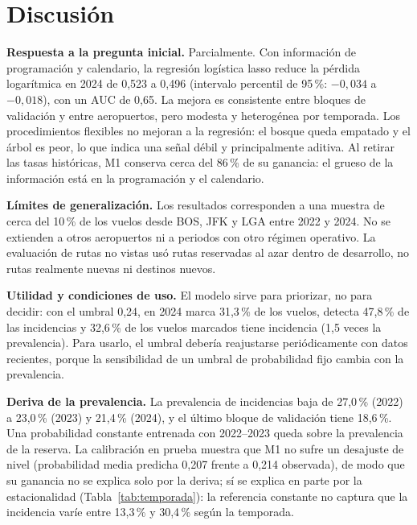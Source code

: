\documentclass[11pt,a4paper]{article}
\begin{document}
 
 
\section{Discusión}
\textbf{Respuesta a la pregunta inicial.} Parcialmente. Con información de programación y calendario, la regresión logística lasso reduce la pérdida logarítmica en 2024 de 0,523 a 0,496 (intervalo percentil de 95\,\%: $-0{,}034$ a $-0{,}018$), con un AUC de 0,65. La mejora es consistente entre bloques de validación y entre aeropuertos, pero modesta y heterogénea por temporada. Los procedimientos flexibles no mejoran a la regresión: el bosque queda empatado y el árbol es peor, lo que indica una señal débil y principalmente aditiva. Al retirar las tasas históricas, M1 conserva cerca del 86\,\% de su ganancia: el grueso de la información está en la programación y el calendario.
 
\textbf{Límites de generalización.} Los resultados corresponden a una muestra de cerca del 10\,\% de los vuelos desde BOS, JFK y LGA entre 2022 y 2024. No se extienden a otros aeropuertos ni a periodos con otro régimen operativo. La evaluación de rutas no vistas usó rutas reservadas al azar dentro de desarrollo, no rutas realmente nuevas ni destinos nuevos.
 
\textbf{Utilidad y condiciones de uso.} El modelo sirve para priorizar, no para decidir: con el umbral 0,24, en 2024 marca 31,3\,\% de los vuelos, detecta 47,8\,\% de las incidencias y 32,6\,\% de los vuelos marcados tiene incidencia (1,5 veces la prevalencia). Para usarlo, el umbral debería reajustarse periódicamente con datos recientes, porque la sensibilidad de un umbral de probabilidad fijo cambia con la prevalencia.
 
\textbf{Deriva de la prevalencia.} La prevalencia de incidencias baja de 27,0\,\% (2022) a 23,0\,\% (2023) y 21,4\,\% (2024), y el último bloque de validación tiene 18,6\,\%. Una probabilidad constante entrenada con 2022--2023 queda sobre la prevalencia de la reserva. La calibración en prueba muestra que M1 no sufre un desajuste de nivel (probabilidad media predicha 0,207 frente a 0,214 observada), de modo que su ganancia no se explica solo por la deriva; sí se explica en parte por la estacionalidad (Tabla~\ref{tab:temporada}): la referencia constante no captura que la incidencia varíe entre 13,3\,\% y 30,4\,\% según la temporada.
 
\end{document}
